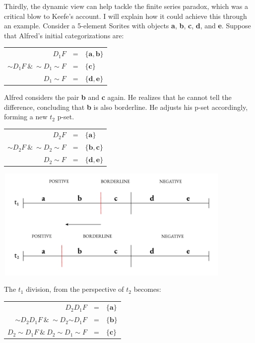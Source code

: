 Thirdly, the dynamic view can help tackle the finite series paradox,
which was a critical blow to Keefe's account. I will explain how it
could achieve this through an example. Consider a 5-element Sorites with
objects \textbf{a}, \textbf{b}, \textbf{c}, \textbf{d}, and \textbf{e}.
Suppose that Alfred's initial categorizations are:

\begin{center}
\begin{tabulary}{\textwidth}{RCL}
$D_1 F$ & = & $\{ \mathbf{a}, \mathbf{b} \}$ \\
${\sim}D_1 F \ \& \ {\sim}D_1{\sim}F$ & = & $\{ \mathbf{c} \}$ \\
$D_{1}{\sim}F$ & = & $\{ \mathbf{d}, \mathbf{e}\}$ \\
\end{tabulary}
\end{center}
Alfred considers the pair \textbf{b} and \textbf{c} again. He realizes
that he cannot tell the difference, concluding that \textbf{b} is also
borderline. He adjusts his p-set accordingly, forming a new \(t_{2}\)
p-set.

\begin{center}
\begin{tabulary}{\textwidth}{RCL}
$D_2 F$ & = & $\{ \mathbf{a} \}$ \\
${\sim} D_2 F \ \& \ {\sim}D_2 {\sim}F$ & = & $\{ \mathbf{b}, \mathbf{c} \}$ \\
$D_2 {\sim}F$ & = & $\{ \mathbf{d}, \mathbf{e} \}$
\end{tabulary}
\end{center}

\begin{center}
\includegraphics[width=4.50937in,height=2.12793in]{papers/figures/2-3.pdf}
 \end{center}
The $t_{1}$ division, from the perspective of $t_{2}$ becomes:

\begin{center}
\begin{tabulary}{\textwidth}{RCL}
$D_2 D_1 F$ & = & $\{ \mathbf{a} \}$ \\
${\sim} D_2 D_1 F \ \& \ {\sim}D_{2}{{\sim}D}_{1}F$ & = & $\{ \mathbf{b} \}$ \\
$D_{2}{\sim}D_{1}F\ \&\ D_{2}{\sim}D_{1}{\sim}F $ & = & $\{ \mathbf{c} \}$
\end{tabulary}
\end{center}

